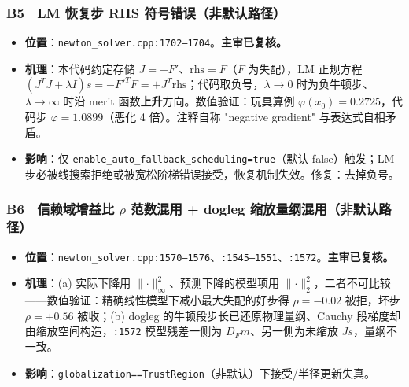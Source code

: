 \documentclass[11pt,a4paper,fontset=fandol]{ctexart}
\newcommand{\file}[1]{\texttt{#1}}
\begin{document}
\subsubsection*{B5　LM 恢复步 RHS 符号错误（非默认路径）}
\begin{itemize}
  \item \textbf{位置}：\file{newton\_solver.cpp:1702--1704}。\textbf{主审已复核。}
  \item \textbf{机理}：本代码约定存储 $J=-F'$、$\mathrm{rhs}=F$（$F$ 为失配），LM 正规方程 $(J^{T}J+\lambda I)s=-F'^{T}F=+J^{T}\mathrm{rhs}$；代码取负号，$\lambda\to 0$ 时为负牛顿步、$\lambda\to\infty$ 时沿 merit 函数\textbf{上升}方向。数值验证：玩具算例 $\varphi(x_0)=0.2725$，代码步 $\varphi=1.0899$（恶化 4 倍）。注释自称 "negative gradient" 与表达式自相矛盾。
  \item \textbf{影响}：仅 \texttt{enable\_auto\_fallback\_scheduling=true}（默认 false）触发；LM 步必被线搜索拒绝或被宽松阶梯错误接受，恢复机制失效。修复：去掉负号。
\end{itemize}

\subsubsection*{B6　信赖域增益比 $\rho$ 范数混用 + dogleg 缩放量纲混用（非默认路径）}
\begin{itemize}
  \item \textbf{位置}：\file{newton\_solver.cpp:1570--1576}、\file{:1545--1551}、\file{:1572}。\textbf{主审已复核。}
  \item \textbf{机理}：(a) 实际下降用 $\lVert\cdot\rVert_\infty^2$、预测下降的模型项用 $\lVert\cdot\rVert_2^2$，二者不可比较——数值验证：精确线性模型下减小最大失配的好步得 $\rho=-0.02$ 被拒，坏步 $\rho=+0.56$ 被收；(b) dogleg 的牛顿段步长已还原物理量纲、Cauchy 段梯度却由缩放空间构造，\file{:1572} 模型残差一侧为 $D_F m$、另一侧为未缩放 $J s$，量纲不一致。
  \item \textbf{影响}：\texttt{globalization==TrustRegion}（非默认）下接受/半径更新失真。
\end{itemize}
\end{document}
